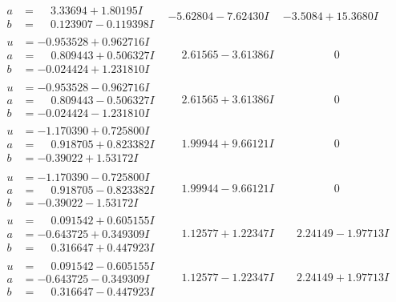 \documentclass[1p]{elsarticle_modified}
\theoremstyle{definition}
\begin{document}
$$\begin{array}{c|c|c}
\begin{aligned}
a &= \phantom{-}3.33694 + 1.80195 I \\
b &= \phantom{-}0.123907 - 0.119398 I\end{aligned}
 & -5.62804 - 7.62430 I & -3.5084 + 15.3680 I \\ \hline\begin{aligned}
u &= -0.953528 + 0.962716 I \\
a &= \phantom{-}0.809443 + 0.506327 I \\
b &= -0.024424 + 1.231810 I\end{aligned}
 & \phantom{-}2.61565 - 3.61386 I & \phantom{-0.000000 } 0 \\ \hline\begin{aligned}
u &= -0.953528 - 0.962716 I \\
a &= \phantom{-}0.809443 - 0.506327 I \\
b &= -0.024424 - 1.231810 I\end{aligned}
 & \phantom{-}2.61565 + 3.61386 I & \phantom{-0.000000 } 0 \\ \hline\begin{aligned}
u &= -1.170390 + 0.725800 I \\
a &= \phantom{-}0.918705 + 0.823382 I \\
b &= -0.39022 + 1.53172 I\end{aligned}
 & \phantom{-}1.99944 + 9.66121 I & \phantom{-0.000000 } 0 \\ \hline\begin{aligned}
u &= -1.170390 - 0.725800 I \\
a &= \phantom{-}0.918705 - 0.823382 I \\
b &= -0.39022 - 1.53172 I\end{aligned}
 & \phantom{-}1.99944 - 9.66121 I & \phantom{-0.000000 } 0 \\ \hline\begin{aligned}
u &= \phantom{-}0.091542 + 0.605155 I \\
a &= -0.643725 + 0.349309 I \\
b &= \phantom{-}0.316647 + 0.447923 I\end{aligned}
 & \phantom{-}1.12577 + 1.22347 I & \phantom{-}2.24149 - 1.97713 I \\ \hline\begin{aligned}
u &= \phantom{-}0.091542 - 0.605155 I \\
a &= -0.643725 - 0.349309 I \\
b &= \phantom{-}0.316647 - 0.447923 I\end{aligned}
 & \phantom{-}1.12577 - 1.22347 I & \phantom{-}2.24149 + 1.97713 I \\ \hline\begin{aligned}

\end{aligned}
\end{array}$$
\end{document}
